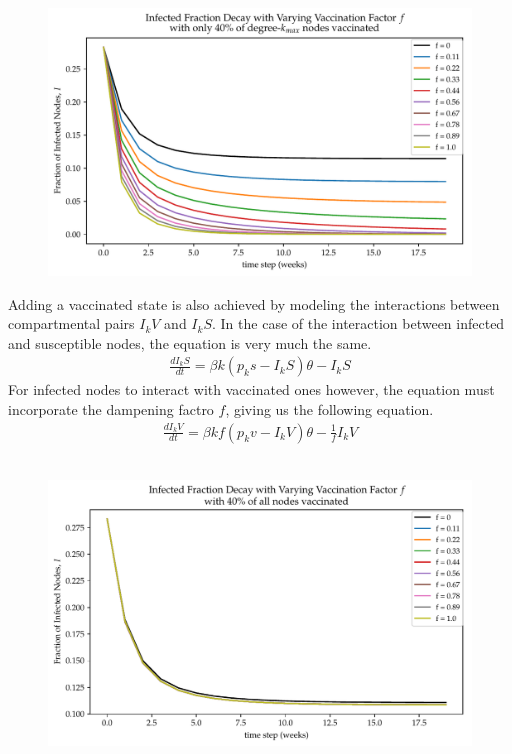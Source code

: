 \documentclass[11pt, oneside]{article}   	%
\newcommand{\prob}[2]{
\indent \\
\noindent{\color{green!50!blue}\bf {\large#1}}
{\normalfont #2}
}
\begin{document}
	\indent \prob{d)}{\vspace{-10mm}
	\begin{figure}[h!]
		\centering
		\includegraphics[width=15cm]{figs/changeinI_Vkmaxnodes-modified-hetmeanfield.pdf}
		\label{changeI_kmaxnodes}\vspace{-4mm}
		\caption{}
	\end{figure}}
    \FloatBarrier
    Adding a vaccinated state is also achieved by modeling the interactions between compartmental pairs $I_{k}V$ and $I_{k}S$. In the case of the
    interaction between infected and susceptible nodes, the equation is very much the same.
    \begin{align}
        \frac{dI_kS}{dt} = \beta k (p_k s - I_k S)\theta - I_k S
    \end{align}
    For infected nodes to interact with vaccinated ones however, the equation must incorporate the dampening factro $f$, giving us the following equation.
    \begin{align}
        \frac{dI_kV}{dt} = \beta kf(p_k v - I_k V)\theta - \frac{1}{f}I_k V
    \end{align}
	\indent \prob{c)}{\vspace{-10mm}
	\begin{figure}[h!]
		\centering
		\includegraphics[width=15cm]{figs/changeinI_Vallnodes.pdf}
		\label{changeI_allnodes}\vspace{-4mm}
		\caption{}
	\end{figure}
	}
\end{document}
